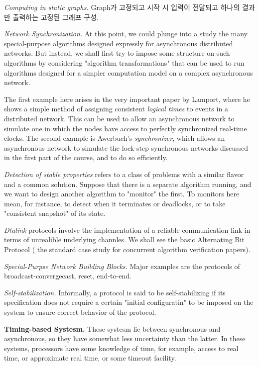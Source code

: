 \documentclass{report}
\theoremstyle{plain}
\theoremstyle{definition}
\theoremstyle{remark}
\begin{document}
\textit{Computing in static graphs.} Graph가 고정되고 시작 시 입력이 전달되고 하나의 
결과만 출력하는 고정된 그래프 구성. 

\textit{Network Synchronization.} At this point, we could plunge into a study the 
many special-purpose algorithms designed expressly for asynchronous distributed
networks. But instead, we shall first try to impose some structure on such algorithms
by considering "algorithm transformations" that can be used to run algorithms 
designed for a simpler computation model on a complex asynchronous network. 

The first example here arises in the very important paper by Lamport, where he 
shows a simple method of assigning consistent \textit{logical times} to events
in a distributed network. This can be used to allow an asynchronous network to 
simulate one in which the nodes have access to perfectly synchronized real-time
clocks. The second example is Awerbuch's \textit{synchronizer}, which allows
an asynchronous network to simulate the lock-step synchronous networks discussed
in the first part of the course, and to do so efficiently. 

\textit{Detection of stable properties} refers to a class of problems with a similar 
flavor and a common solution. Suppose that there is a separate algorithm running, 
and we want to design another algorithm to "monitor" the first. To monitors here
mean, for instance, to detect when it terminates or deadlocks, or to take  
"consistent snapshot" of its state.

\textit{Dtalink} protocols involve the implementation of a reliable communication link 
in terms of unrealible underlying channles. We shall see the basic Alternating Bit 
Protocol ( the standard case study for concurrent algorithm verification papers).

\textit{Special-Purpse Network Building Blocks.} Major examples are the protocols
of broadcast-convergecast, reset, end-to-end. 

\textit{Self-stabilization.} Informally, a protocol is said to be self-stabilizing 
if its specification does not require a certain "initial configuratin" to be imposed
on the system to ensure correct behavior of the protocol. 

\noindent \textbf{Timing-based Systesm.} These systesm lie between synchronous and 
asynchronous, so they have somewhat less uncertainty than the latter. 
In these systems, processors have some knowledge of time, for example, access to 
real time, or approximate real time, or some timeout facility. 
\end{document}
